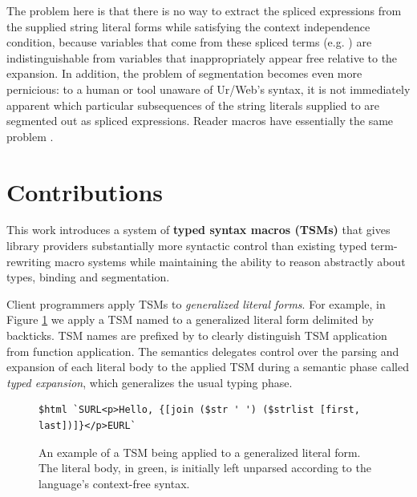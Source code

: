 The problem here is that there is no way to extract the spliced expressions from the supplied string literal forms while satisfying the context independence condition, because variables that come from these spliced terms (e.g. ) are indistinguishable from variables that inappropriately appear free relative to the expansion. In addition, the problem of segmentation becomes even more pernicious: to a human or tool unaware of Ur/Web's syntax, it is not immediately apparent which particular subsequences of the string literals supplied to  are segmented out as spliced expressions. Reader macros have essentially the same problem  \cite{DBLP:journals/jfp/FlattCDF12}.

\section{Contributions}\label{sec:contributions}

This work introduces a system of \textbf{typed syntax macros (TSMs)} that gives library providers substantially more syntactic control than existing typed term-rewriting macro systems while maintaining the ability to reason abstractly about types, binding and segmentation.%

Client programmers apply TSMs to \emph{generalized literal forms}. For example, in Figure \ref{fig:first-tsm-example} we apply a TSM named  to a generalized literal form delimited by backticks. TSM names are prefixed by \li{#\dolla#} to clearly distinguish TSM application from function application. The semantics delegates control over the parsing and expansion of each literal body to the applied TSM during a semantic phase called \emph{typed expansion}, which generalizes the usual typing phase. 
\begin{figure}[ht!]
\begin{lstlisting}[numbers=none,xleftmargin=0px]
$html `SURL<p>Hello, {[join ($str ' ') ($strlist [first, last])]}</p>EURL`
\end{lstlisting}
\caption{An example of a TSM being applied to a generalized literal form. The literal body, in green, is initially left unparsed according to the language's context-free syntax.}
\label{fig:first-tsm-example}
\end{figure}

